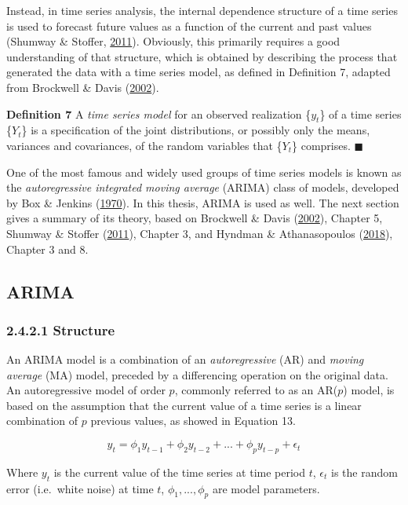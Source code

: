 \documentclass[12pt,oneside]{reedthesis}
\begin{document}
Instead, in time series analysis, the internal dependence structure of a
time series is used to forecast future values as a function of the
current and past values (Shumway \& Stoffer,
\protect\hyperlink{ref-shumway2011}{2011}). Obviously, this primarily
requires a good understanding of that structure, which is obtained by
describing the process that generated the data with a time series model,
as defined in Definition 7, adapted from Brockwell \& Davis
(\protect\hyperlink{ref-brockwell2002}{2002}).

\textbf{Definition 7} A \emph{time series model} for an observed
realization \{\(y_{t}\)\} of a time series \{\(Y_{t}\)\} is a
specification of the joint distributions, or possibly only the means,
variances and covariances, of the random variables that \{\(Y_{t}\)\}
comprises. \(\blacksquare\)

One of the most famous and widely used groups of time series models is
known as the \emph{autoregressive integrated moving average} (ARIMA)
class of models, developed by Box \& Jenkins
(\protect\hyperlink{ref-box1970}{1970}). In this thesis, ARIMA is used
as well. The next section gives a summary of its theory, based on
Brockwell \& Davis (\protect\hyperlink{ref-brockwell2002}{2002}),
Chapter 5, Shumway \& Stoffer
(\protect\hyperlink{ref-shumway2011}{2011}), Chapter 3, and Hyndman \&
Athanasopoulos (\protect\hyperlink{ref-hyndman2018fpp}{2018}), Chapter 3
and 8.

\subsection{ARIMA}\label{arima}

\subsubsection{2.4.2.1 Structure}\label{structure}

An ARIMA model is a combination of an \emph{autoregressive} (AR) and
\emph{moving average} (MA) model, preceded by a differencing operation
on the original data. An autoregressive model of order \(p\), commonly
referred to as an AR(\(p\)) model, is based on the assumption that the
current value of a time series is a linear combination of \(p\) previous
values, as showed in Equation 13.

\[ y_{t} = \phi_{1}y_{t-1} + \phi_{2}y_{t-2} + ... + \phi_{p}y_{t-p} + \epsilon_{t} \]

Where \(y_{t}\) is the current value of the time series at time period
\(t\), \(\epsilon_{t}\) is the random error (i.e.~white noise) at time
\(t\), \(\phi_{1},...,\phi_{p}\) are model parameters.
\end{document}
